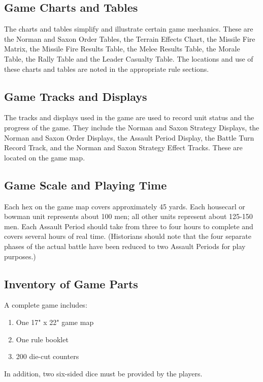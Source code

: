 \subsection{Game Charts and Tables}


The charts and tables simplify and illustrate certain game mechanics. These are the Norman and Saxon Order Tables, the Terrain Effects Chart, the Missile Fire Matrix, the Missile Fire Results Table, the Melee Results Table, the Morale Table, the Rally Table and the Leader Casualty Table. The locations and use of these charts and tables are noted in the appropriate rule sections.

\subsection{Game Tracks and Displays}

The tracks and displays used in the game are used to record unit status and the progress of the game. They include the Norman and Saxon Strategy Displays, the Norman and Saxon Order Displays, the Assault Period Display, the Battle Turn Record Track, and the Norman and Saxon Strategy Effect Tracks. These are located on the game map.

\subsection{Game Scale and Playing Time}

Each hex on the game map covers approximately 45 yards. Each housecarl or bowman unit represents about 100 men; all other units represent about 125-150 men. Each Assault Period should take from three to four hours to complete and covers several hours of real time. (Historians should note that the four separate phases of the actual battle have been reduced to two Assault Periods for play purposes.)

\subsection{Inventory of Game Parts}

A complete game includes:

\begin{enumerate}[label=*]
    \item One 17" x 22" game map
    \item One rule booklet
    \item 200 die-cut counters
\end{enumerate}

In addition, two six-sided dice must be provided by the players.